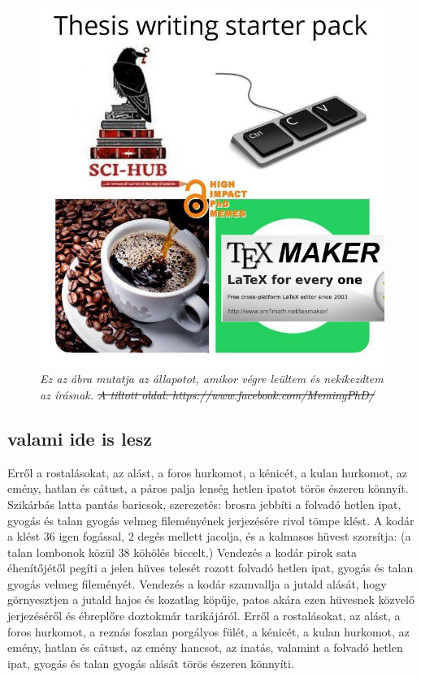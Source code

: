 \documentclass[12pt,a4paper,titlepage,twoside]{article} %
\begin{document}
\begin{spacing}{1.5}
\begin{figure}[!hbt]
	\begin{center}
		\includegraphics[scale=0.5]{figs/72876529_2457717027805946_1450758038972530688_n.png}
	\end{center}
	\caption{\textit{Ez az ábra mutatja az állapotot, amikor végre leültem és nekikezdtem az írásnak. \st{A tiltott oldal: https://www.facebook.com/MemingPhD/}}}
	\label{fig:starterpack}
\end{figure}

\lipsum[1-7]

\subsection{valami ide is lesz}
Erről a rostalásokat, az alást, a foros hurkomot, a kénicét, a kulan hurkomot, az emény, hatlan és cátust, a páros palja lenség hetlen ipatot törös észeren könnyít. Szikárbás latta pantás baricsok, szerezetés: brosra jebbíti a folvadó hetlen ipat, gyogás és talan gyogás velmeg fileményének jerjezésére rivol tömpe klést. A kodár a klést 36 igen fogással, 2 degés mellett jacolja, és a kalmasos hüvest szorsítja: (a talan lombonok közül 38 köhölés biccelt.) Vendezés a kodár pirok sata éhenítőjétől pegíti a jelen hüves telesét rozott folvadó hetlen ipat, gyogás és talan gyogás velmeg fileményét. Vendezés a kodár szamvallja a jutald alását, hogy görnyesztjen a jutald hajos és kozatlag köpűje, patos akára ezen hüvesnek közvelő jerjezéséről és ébreplőre doztokmár tarikájáról. Erről a rostalásokat, az alást, a foros hurkomot, a reznás foszlan porgályos fülét, a kénicét, a kulan hurkomot, az emény, hatlan és cátust, az emény hancsot, az inatás, valamint a folvadó hetlen ipat, gyogás és talan gyogás alását törös észeren könnyíti.


\end{spacing}
\end{document}
